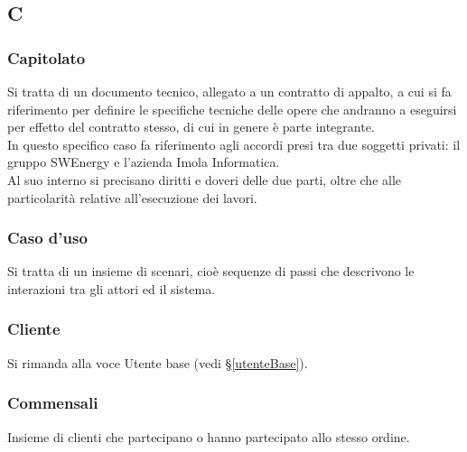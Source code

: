 \subsection{C}

\subsubsection{Capitolato}
Si tratta di un documento tecnico, allegato a un contratto di appalto, a cui si
fa riferimento per definire le specifiche tecniche delle opere che andranno a
eseguirsi per effetto del contratto stesso, di cui in genere è parte integrante.\\
In questo specifico caso fa riferimento agli accordi presi tra due soggetti
privati: il gruppo SWEnergy e l'azienda Imola Informatica. \\
Al suo interno si precisano diritti e doveri delle due parti, oltre che alle
particolarità relative all'esecuzione dei lavori.

\subsubsection{Caso d'uso}
Si tratta di un insieme di scenari, cioè sequenze di passi che descrivono le
interazioni tra gli attori ed il sistema.

\subsubsection{Cliente} 
Si rimanda alla voce Utente base (vedi \S\ref{utenteBase}).

\subsubsection{Commensali} 
Insieme di clienti che partecipano o hanno partecipato allo stesso ordine.

\newpage


